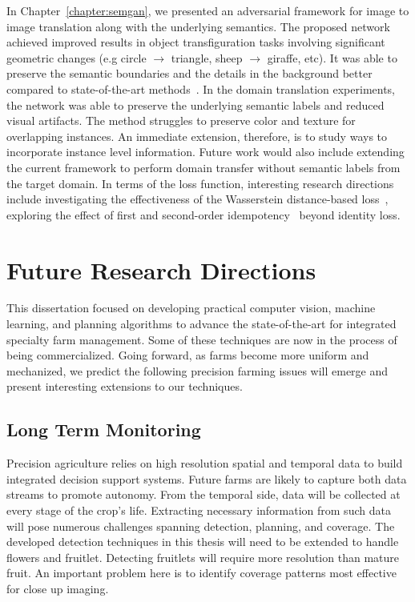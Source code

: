 In Chapter~\ref{chapter:semgan}, we presented an adversarial framework for image to image translation along with the underlying semantics. The proposed network achieved improved results in object transfiguration tasks involving significant geometric changes (e.g circle $\to$ triangle, sheep $\to$ giraffe, etc). It was able to preserve the semantic boundaries and the details in the background better compared to state-of-the-art methods~\cite{zhu_unpaired_2017,mo_instance-aware_2019}. In the domain translation experiments, the network was able to preserve the underlying semantic labels and reduced visual artifacts. The method struggles to preserve color and texture for overlapping instances. An immediate extension, therefore, is to study ways to incorporate instance level information. Future work would also include extending the current framework to perform domain transfer without semantic labels from the target domain. In terms of the loss function, interesting research directions include investigating the effectiveness of the Wasserstein distance-based loss~\cite{shen_wasserstein_2017}, exploring the effect of first and second-order idempotency~\cite{ostyakov2018seigan} beyond identity loss.



\section{Future Research Directions}
This dissertation focused on developing practical computer vision, machine learning, and planning algorithms to advance the state-of-the-art for integrated specialty farm management. Some of these techniques are now in the process of being commercialized. Going forward, as farms become more uniform and mechanized, we predict the following precision farming issues will emerge and present interesting extensions to our techniques.

\subsection{Long Term Monitoring}
Precision agriculture relies on high resolution spatial and temporal data to build integrated decision support systems. Future farms are likely to capture both data streams to promote autonomy. From the temporal side, data will be collected at every stage of the crop's life. Extracting necessary information from such data will pose numerous challenges spanning detection, planning, and coverage. The developed detection techniques in this thesis will need to be extended to handle flowers and fruitlet. Detecting fruitlets will require more resolution than mature fruit. An important problem here is to identify coverage patterns most effective for close up imaging.

